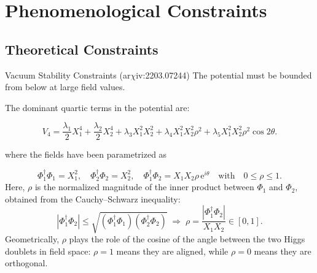 \documentclass{../bredelebeamer}
\newcommand{\arxiv}{ar$\chi$iv:}
\begin{document}
\section{Phenomenological Constraints}
\subsection{Theoretical Constraints}
\begin{frame}{{Vacuum Stability Constraints} (\arxiv 2203.07244)}
    The potential must be bounded from below at large field values.  

    \vfill
    The dominant quartic terms in the potential are:

    $$
    V_4 = \frac{\lambda_1}{2} X_1^4 + \frac{\lambda_2}{2} X_2^4 
    + \lambda_3 X_1^2 X_2^2 
    + \lambda_4 X_1^2 X_2^2 \rho^2
    + \lambda_5 X_1^2 X_2^2 \rho^2 \cos 2\theta .
    $$

    where the fields have been parametrized as

    $$
    \Phi_1^{\dagger} \Phi_1 = X_1^2, \quad 
    \Phi_2^{\dagger} \Phi_2 = X_2^2, \quad 
    \Phi_1^{\dagger} \Phi_2 = X_1 X_2 \rho \, \mathrm{e}^{i \theta} \quad \text{with} \quad 0 \leq \rho \leq 1 .
    $$
    \vfill
    Here, $\rho$ is the normalized magnitude of the inner product between $\Phi_1$ and $\Phi_2$, obtained from the Cauchy--Schwarz inequality:
    $$
    |\Phi_1^{\dagger} \Phi_2| \leq \sqrt{(\Phi_1^{\dagger} \Phi_1)(\Phi_2^{\dagger} \Phi_2)} \; \Rightarrow \; 
    \rho = \frac{|\Phi_1^{\dagger} \Phi_2|}{X_1 X_2} \in [0,1] .
    $$
    Geometrically, $\rho$ plays the role of the cosine of the angle between the two Higgs doublets in field space:
    $\rho = 1$ means they are aligned, while $\rho = 0$ means they are orthogonal.

    
    
\end{frame}
\end{document}
